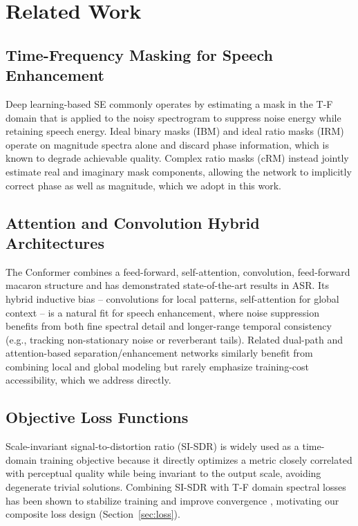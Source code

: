 \documentclass[conference]{IEEEtran}
\begin{document}
\section{Related Work}

\subsection{Time-Frequency Masking for Speech Enhancement}
Deep learning-based SE commonly operates by estimating a mask in the T-F domain that is
applied to the noisy spectrogram to suppress noise energy while retaining speech energy.
Ideal binary masks (IBM) and ideal ratio masks (IRM) \cite{wang2018supervised} operate on
magnitude spectra alone and discard phase information, which is known to degrade
achievable quality. Complex ratio masks (cRM) \cite{williamson2015complex} instead jointly
estimate real and imaginary mask components, allowing the network to implicitly correct
phase as well as magnitude, which we adopt in this work.

\subsection{Attention and Convolution Hybrid Architectures}
The Conformer \cite{gulati2020conformer} combines a feed-forward, self-attention,
convolution, feed-forward macaron structure and has demonstrated state-of-the-art results in
ASR. Its hybrid inductive bias -- convolutions for local patterns, self-attention for global
context -- is a natural fit for speech enhancement, where noise suppression benefits from
both fine spectral detail and longer-range temporal consistency (e.g., tracking
non-stationary noise or reverberant tails). Related dual-path and attention-based
separation/enhancement networks \cite{luo2020dual,koizumi2021df} similarly benefit from
combining local and global modeling but rarely emphasize training-cost accessibility, which
we address directly.

\subsection{Objective Loss Functions}
Scale-invariant signal-to-distortion ratio (SI-SDR) \cite{leroux2019sdr} is widely used as a
time-domain training objective because it directly optimizes a metric closely correlated
with perceptual quality while being invariant to the output scale, avoiding degenerate
trivial solutions. Combining SI-SDR with T-F domain spectral losses has been shown to
stabilize training and improve convergence \cite{pandey2019new}, motivating our composite
loss design (Section~\ref{sec:loss}).
\end{document}
